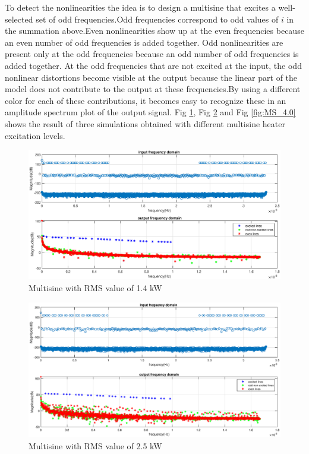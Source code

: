 \documentclass[a4paper,12pt]{article}
\numberwithin{equation}{section}
\begin{document}
To detect the nonlinearities the idea is to design a multisine  that excites a well-selected set of odd frequencies.Odd frequencies correspond  to odd values of $i$ in the summation above.Even nonlinearities show up at the even frequencies because an even number of odd frequencies is added together. Odd nonlinearities are present only at the odd frequencies because an odd number of odd frequencies is added together. At the odd frequencies that are not excited at the input, the odd nonlinear distortions become visible at the output because the linear part of the model does not contribute to the output at these frequencies.By using a different color for each of these
contributions, it becomes easy to recognize these in an amplitude spectrum plot of the output signal. Fig \ref{fig:MS_1.4},  Fig \ref{fig:MS_2.5} and  Fig \ref{fig:MS_4.0} shows the result of three simulations obtained with different multisine heater  excitation levels.

\begin{figure}[H]
    \includegraphics[scale=0.6]{fdomain_input_rms_1400.eps}
    \centering
    \caption{Multisine with RMS value of 1.4 kW}
    \label{fig:MS_1.4}
\end{figure}

\begin{figure}[H]
    \includegraphics[scale=0.5]{fdomain_input_rms_2500.eps}
    \centering
    \caption{Multisine with RMS value of 2.5 kW}
    \label{fig:MS_2.5}
\end{figure}
\end{document}
